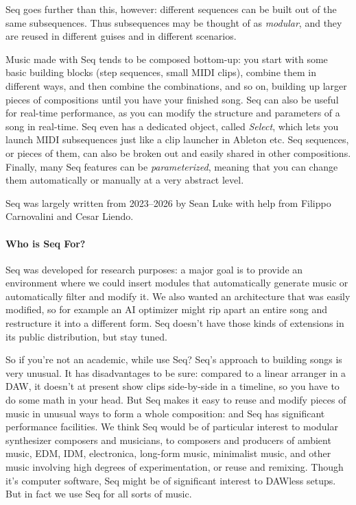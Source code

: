 \documentclass[twoside,10pt]{article}
\begin{document}
Seq goes further than this, however: different sequences can be built out of the same subsequences.  Thus subsequences may be thought of as {\it modular}, and they are reused in different guises and in different scenarios.  

Music made with Seq tends to be composed bottom-up: you start with some basic building blocks (step sequences, small MIDI clips), combine them in different ways, and then combine the combinations, and so on, building up larger pieces of compositions until you have your finished song.  Seq can also be useful for real-time performance, as you can modify the structure and parameters of a song in real-time.  Seq even has a dedicated object, called {\it Select}, which lets you launch MIDI subsequences just like a clip launcher in Ableton etc.  Seq sequences, or pieces of them, can also be broken out and easily shared in other compositions.  Finally, many Seq features can be {\it parameterized}, meaning that you can change them automatically or manually at a very abstract level.

Seq was largely written from 2023--2026 by Sean Luke with help from Filippo Carnovalini and Cesar Liendo.

\paragraph{Who is Seq For?}

Seq was developed for research purposes: a major goal is to provide an environment where we could insert modules that automatically generate music or automatically filter and modify it.  We also wanted an architecture that was easily modified, so for example an AI optimizer might rip apart an entire song and restructure it into a different form.  Seq doesn't have those kinds of extensions in its public distribution, but stay tuned.

So if you're not an academic, while use Seq?  Seq's approach to building songs is very unusual.  It has disadvantages to be sure: compared to a linear arranger in a DAW, it doesn't at present show clips side-by-side in a timeline, so you have to do some math in your head.  But Seq makes it easy to reuse and modify pieces of music in unusual ways to form a whole composition: and Seq has significant performance facilities.  We think Seq would be of particular interest to modular synthesizer composers and musicians, to composers and producers of ambient music, EDM, IDM, electronica, long-form music, minimalist music, and other music involving high degrees of experimentation, or reuse and remixing.  Though it's computer software, Seq might be of significant interest to DAWless setups.  But in fact we use Seq for all sorts of music.
\end{document}

